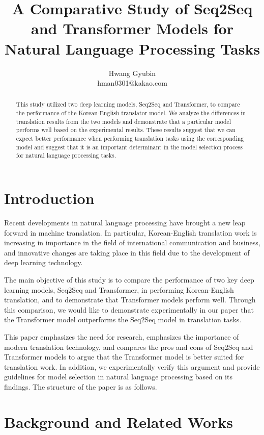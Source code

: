 \documentclass{article}
\title{A Comparative Study of Seq2Seq and Transformer Models for Natural Language Processing Tasks}
\author{Hwang Gyubin\\hman0301@kakao.com}
\begin{document}
\maketitle

\begin{abstract}
This study utilized two deep learning models, Seq2Seq and Transformer, to compare the performance of the Korean-English translator model. We analyze the differences in translation results from the two models and demonstrate that a particular model performs well based on the experimental results. These results suggest that we can expect better performance when performing translation tasks using the corresponding model and suggest that it is an important determinant in the model selection process for natural language processing tasks.
\end{abstract}

\section{Introduction}

Recent developments in natural language processing have brought a new leap forward in machine translation. In particular, Korean-English translation work is increasing in importance in the field of international communication and business, and innovative changes are taking place in this field due to the development of deep learning technology.

The main objective of this study is to compare the performance of two key deep learning models, Seq2Seq and Transformer, in performing Korean-English translation, and to demonstrate that Transformer models perform well. Through this comparison, we would like to demonstrate experimentally in our paper that the Transformer model outperforms the Seq2Seq model in translation tasks.

This paper emphasizes the need for research, emphasizes the importance of modern translation technology, and compares the pros and cons of Seq2Seq and Transformer models to argue that the Transformer model is better suited for translation work. In addition, we experimentally verify this argument and provide guidelines for model selection in natural language processing based on its findings. The structure of the paper is as follows.

\section{Background and Related Works}
\end{document}
